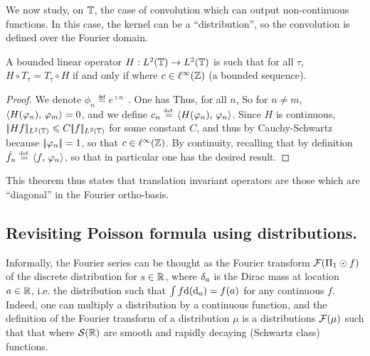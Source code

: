 We now study, on $\mathbb{T}$, the case of convolution which can output non-continuous functions. In this case, the kernel can be a ``distribution'', so the convolution is defined over the Fourier domain. 

\begin{prop}\label{prop-ti-convol-l2}
 	A bounded linear operator $H : L^2(\mathbb{T}) \rightarrow L^2(\mathbb{T})$ is such that for all $\tau$, $H \circ T_\tau = T_\tau \circ H$ if and only if 
	where $c \in \ell^\infty(\mathbb{Z})$ (a bounded sequence).
\end{prop}
\begin{proof}
	We denote $\phi_n \eqdef e^{\imath n \cdot}$. 
	One has
	Thus, for all $n$, 
	So for $n \neq m$, $\langle H(\varphi_n),\,\varphi_m\rangle = 0$, and we define $c_n \stackrel{\mbox{\upshape\tiny def.}}{=} \langle H(\varphi_n),\,\varphi_n\rangle$. Since $H$ is continuous, $|\!| Hf |\!|_{L^2(\mathbb{T})} \leqslant C |\!| f |\!|_{L^2(\mathbb{T})}$ for some constant $C$, and thus
	by Cauchy-Schwartz 
	because $|\!| \varphi_n |\!|=1$, so that $c \in \ell^\infty(\mathbb{Z})$.
	By continuity, recalling that by definition $\hat f_n \stackrel{\mbox{\upshape\tiny def.}}{=} \langle f,\,\varphi_n\rangle$, 
	so that in particular one has the desired result.
\end{proof}

This theorem thus states that translation invariant operators are those which are ``diagonal'' in the Fourier ortho-basis. 

\subsection{Revisiting Poisson formula using distributions.}

Informally, the Fourier series
can be thought as the Fourier transform $\mathcal{F}( \Pi_1 \odot f )$ of the discrete distribution
for $s \in \mathbb{R}$, 
where $\delta_a$ is the Dirac mass at location $a \in \mathbb{R}$, i.e. the distribution such that $\int f \mathrm{d}(\mathrm{d}_a)=f(a)$ for any continuous $f$. Indeed, one can multiply a distribution by a continuous function, and the definition of the Fourier transform of a distribution $\mu$ is a distributions $\mathcal{F}(\mu)$ such that that 
where $\mathcal{S}(\mathbb{R})$ are smooth and rapidly decaying (Schwartz class) functions.

